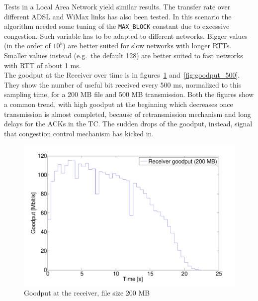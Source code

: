 \documentclass[10pt,twocolumn]{article}
\begin{document}
Tests in a Local Area Network yield similar results. The transfer rate over different ADSL and WiMax links has also been tested. In
this scenario the algorithm needed some tuning of the \texttt{MAX\_BLOCK}
constant due to excessive congestion. Such variable has to be adapted to
different networks. Bigger values (in the order of $10^5$) are better suited
for slow networks with longer RTTs. Smaller values instead (e.g.\ the default
128) are better suited to fast networks with RTT of about 1 ms. \\
The goodput at the Receiver over time is in figures~\ref{fig:goodput_200} and~\ref{fig:goodput_500}. They show the number of useful bit received every 500 ms, normalized to this sampling time, for a 200 MB file and 500 MB transmission. Both the figures show a common trend, with high goodput at the beginning which decreases once transmission is almost completed, because of retransmission mechanism and long delays for the ACKs in the TC. The sudden drops of the goodput, instead, signal that congestion control mechanism has kicked in.\\

\begin{figure}[h]
  \centering
  \includegraphics[width = 0.95\columnwidth, keepaspectratio]{tex/images/goodput_c2_200.pdf}
  \caption{Goodput at the receiver, file size 200 MB}
  \label{fig:goodput_200}
\end{figure}
\end{document}
